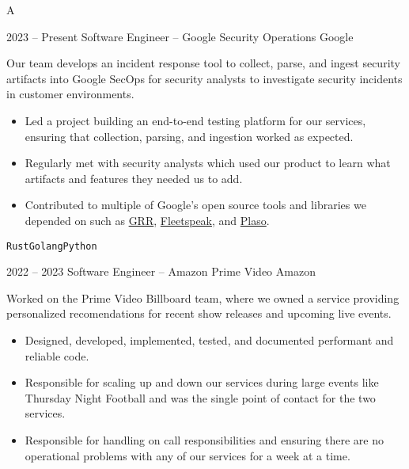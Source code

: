 \documentclass[9pt]{developercv} %
\begin{document}
\vspace{0.5cm} %



A


\begin{entrylist}
  \entry
  {2023 -- Present}
  {Software Engineer -- Google Security Operations}
  {Google}
  {
    Our team develops an incident response tool to collect,
    parse, and ingest security artifacts into Google SecOps for security
    analysts to investigate security incidents in customer environments.

    \begin{itemize}[leftmargin=\parindent, leftmargin=*]

      \item
        Led a project building an end-to-end testing platform for our services,
        ensuring that collection, parsing, and ingestion worked as
        expected.
      \item
        Regularly met with security analysts which used our product to learn
        what artifacts and features they needed us to add.
      \item
        Contributed to multiple of Google's open source
        tools and libraries we depended on such as
        \href{https://github.com/google/grr}{GRR},
        \href{https://github.com/google/fleetspeak}{Fleetspeak}, and
        \href{https://github.com/log2timeline/plaso}{Plaso}.
    \end{itemize}

  \texttt{Rust}\slashsep\texttt{Golang}\slashsep\texttt{Python}}
  \entry
  {2022 -- 2023}
  {Software Engineer -- Amazon Prime Video}
  {Amazon}
  {
    Worked on the Prime Video Billboard team, where we owned a service
    providing personalized recomendations for recent show releases and upcoming
    live events.

    \begin{itemize}[leftmargin=\parindent, leftmargin=*]
      \item Designed, developed, implemented, tested, and documented
        performant and reliable code.
      \item Responsible for scaling up and down our services during
        large events like Thursday Night Football and was the single
        point of contact for the two services.
      \item Responsible for handling on call responsibilities and
        ensuring there are no operational problems with any of our
        services for a week at a time.
    \end{itemize}

}
\end{entrylist}
\end{document}
